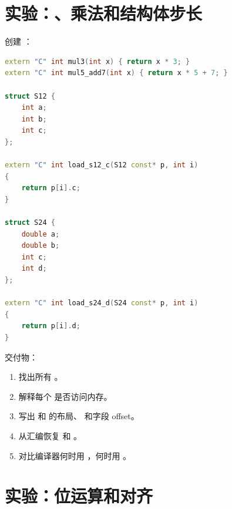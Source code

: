 \section{实验：、乘法和结构体步长}

\begin{labbox}
创建 ：

\begin{lstlisting}[language=C++]
extern "C" int mul3(int x) { return x * 3; }
extern "C" int mul5_add7(int x) { return x * 5 + 7; }

struct S12 {
    int a;
    int b;
    int c;
};

extern "C" int load_s12_c(S12 const* p, int i)
{
    return p[i].c;
}

struct S24 {
    double a;
    double b;
    int c;
    int d;
};

extern "C" int load_s24_d(S24 const* p, int i)
{
    return p[i].d;
}
\end{lstlisting}

交付物：

\begin{enumerate}
  \item 找出所有 。
  \item 解释每个  是否访问内存。
  \item 写出  和  的布局、 和字段 offset。
  \item 从汇编恢复  和 。
  \item 对比编译器何时用 ，何时用 。
\end{enumerate}
\end{labbox}

\section{实验：位运算和对齐}

